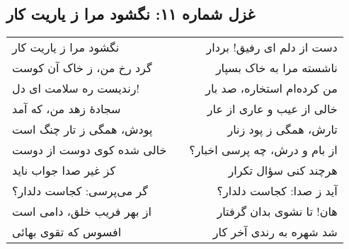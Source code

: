 \begin{center}
\section*{غزل شماره ۱۱: نگشود مرا ز یاریت کار}
\label{sec:011}
\begin{longtable}{l p{0.5cm} r}
نگشود مرا ز یاریت کار
&&
دست از دلم ای رفیق! بردار
\\
گرد رخ من، ز خاک آن کوست
&&
ناشسته مرا به خاک بسپار
\\
رندیست ره سلامت ای دل!
&&
من کرده‌ام استخاره، صد بار
\\
سجادهٔ زهد من، که آمد
&&
خالی از عیب و عاری از عار
\\
پودش، همگی ز تار چنگ است
&&
تارش، همگی ز پود زنار
\\
خالی شده کوی دوست از دوست
&&
از بام و درش، چه پرسی اخبار؟
\\
کز غیر صدا جواب ناید
&&
هرچند کنی سؤال تکرار
\\
گر می‌پرسی: کجاست دلدار؟
&&
آید ز صدا: کجاست دلدار؟
\\
از بهر فریب خلق، دامی است
&&
هان! تا نشوی بدان گرفتار
\\
افسوس که تقوی بهائی
&&
شد شهره به رندی آخر کار
\\
\end{longtable}
\end{center}
